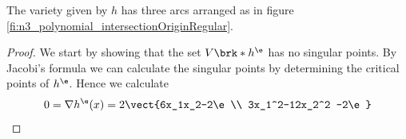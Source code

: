 \begin{proposition}\label{pr:n3_polynomial_regularH}
  The variety given by $h$ has three arcs arranged as in figure \ref{fi:n3_polynomial_intersectionOriginRegular}.
\end{proposition}
\begin{proof}
  
  We start by showing that the set $V\brk*{h^\e}$ has no singular points.
  By Jacobi's formula we can calculate the singular points by determining the critical points
  of $h^\e$. Hence we calculate
  \begin{align}
    0=\nabla h^\e(x)=2\vect{6x_1x_2-2\e \\ 3x_1^2-12x_2^2 -2\e}
  \end{align}
    

\end{proof}
